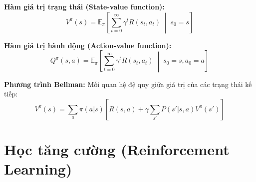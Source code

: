 \textbf{Hàm giá trị trạng thái (State-value function):}
\begin{equation}
    V^{\pi}(s) = \mathbb{E}_{\pi}\left[\sum_{t=0}^{\infty} \gamma^t R(s_t, a_t) \;\middle|\; s_0 = s\right]
    \label{eq:value_function}
\end{equation}

\textbf{Hàm giá trị hành động (Action-value function):}
\begin{equation}
    Q^{\pi}(s, a) = \mathbb{E}_{\pi}\left[\sum_{t=0}^{\infty} \gamma^t R(s_t, a_t) \;\middle|\; s_0 = s, a_0 = a\right]
    \label{eq:q_function}
\end{equation}

\textbf{Phương trình Bellman:} Mối quan hệ đệ quy giữa giá trị của các trạng thái kế tiếp:
\begin{equation}
    V^{\pi}(s) = \sum_{a} \pi(a|s) \left[ R(s,a) + \gamma \sum_{s'} P(s'|s,a) V^{\pi}(s') \right]
    \label{eq:bellman}
\end{equation}

\section{Học tăng cường (Reinforcement Learning)}

